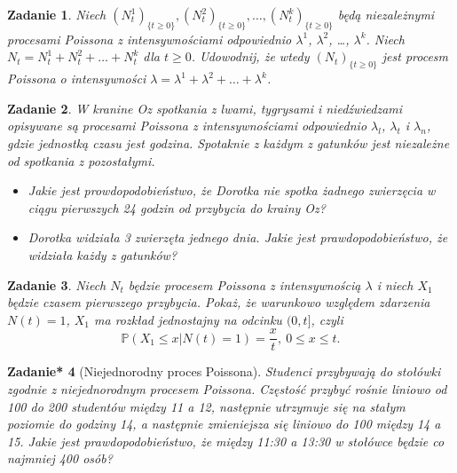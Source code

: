 \documentclass{mwart}
\newtheorem{zd}{Zadanie}
\newtheorem{zdt}[zd]{Zadanie*}
\begin{document}
\begin{zd}
Niech $(N_t^1)_{\{t \geq 0\}}, (N_t^2)_{\{t \geq 0\}}, \dots, (N_t^k)_{\{t \geq 0\}}$ będą niezależnymi procesami Poissona z intensywnościami odpowiednio $\lambda^1$, $\lambda^2$, \dots, $\lambda^k$. Niech $N_t = N_t^1 + N_t^2 + \dots + N_t^k$ dla $t \geq 0$. Udowodnij, że wtedy $(N_t)_{\{t \geq 0\}}$ jest procesm Poissona o intensywności $\lambda = \lambda^1 + \lambda^2 + \dots + \lambda^k$.
\end{zd}

\begin{zd}
W kranine Oz spotkania z lwami, tygrysami i niedźwiedzami opisywane są procesami Poissona z intensywnościami odpowiednio $\lambda_l$, $\lambda_t$ i $\lambda_n$, gdzie jednostką czasu jest godzina. Spotaknie z każdym z gatunków jest niezależne od spotkania z pozostałymi.
\begin{itemize}
\item Jakie jest prowdopodobieństwo, że Dorotka nie spotka żadnego zwierzęcia w ciągu pierwszych 24 godzin od przybycia do krainy Oz?
\item Dorotka widziała 3 zwierzęta jednego dnia. Jakie jest prawdopodobieństwo, że widziała każdy z gatunków?
\end{itemize}
\end{zd}

\begin{zd}
	Niech $N_t$ będzie procesem Poissona z intensywnością $\lambda$ i niech $X_1$ będzie czasem pierwszego przybycia. Pokaż, że warunkowo względem zdarzenia $N(t) = 1$, $X_1$ ma rozkład jednostajny na odcinku $(0,t]$, czyli
	\begin{displaymath}
	\mathbb{P}\left(X_1 \leq x|N(t) = 1\right) = \frac{x}{t},\ 0\leq x\leq t.
	\end{displaymath}
\end{zd}

\begin{zdt}[Niejednorodny proces Poissona] Studenci przybywają do stołówki zgodnie z niejednorodnym procesem Poissona. Częstość przybyć rośnie liniowo od 100 do 200 studentów między 11 a 12, następnie utrzymuje się na stałym poziomie do godziny 14, a następnie zmieniejsza się liniowo do 100 między 14 a 15. Jakie jest prawdopodobieństwo, że między 11:30 a 13:30 w stołówce będzie co najmniej 400 osób?

\end{zdt}
\end{document}
